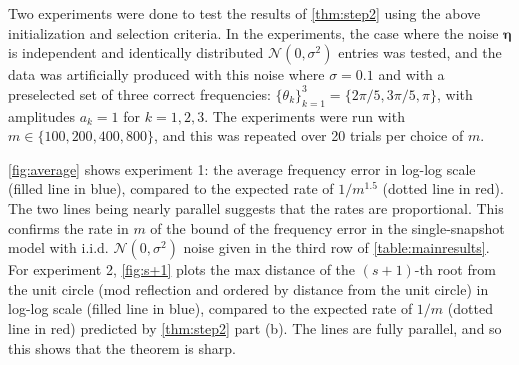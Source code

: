 \documentclass[11pt]{article}
\theoremstyle{definition}
\numberwithin{theorem}{section}
\numberwithin{equation}{section}
\renewcommand{\epsilon}{\varepsilon}
\newcommand{\bfeta}{{\boldsymbol \eta}}
\newcommand{\calN}{\mathcal{N}}
\numberwithin{equation}{section}
\begin{document}
Two experiments were done to test the results of \cref{thm:step2} using the above initialization and selection criteria. In the experiments, the case where the noise $\bfeta$ is independent and identically distributed $\calN(0,\sigma^2)$ entries was tested, and the data was artificially produced with this noise where $\sigma=0.1$ and with a preselected set of three correct frequencies: $\{\theta_k\}_{k=1}^3 = \{2\pi/5, 3\pi/5, \pi\}$, with amplitudes $a_k = 1$ for $k=1,2,3$. The experiments were run with $m\in\{100,200,400,800\}$, and this was repeated over 20 trials per choice of $m$. 


\cref{fig:average} shows experiment 1: the average frequency error in log-log scale (filled line in blue), compared to the expected rate of $1/m^{1.5}$ (dotted line in red). The two lines being nearly parallel suggests that the rates are proportional. This confirms the rate in $m$ of the bound of the frequency error in the single-snapshot model with i.i.d. $\calN(0,\sigma^2)$ noise given in the third row of \cref{table:mainresults}. For experiment 2, \cref{fig:s+1} plots the max distance of the $(s+1)$-th root from the unit circle (mod reflection and ordered by distance from the unit circle) in log-log scale (filled line in blue), compared to the expected rate of $1/m$ (dotted line in red) predicted by \cref{thm:step2} part (b). The lines are fully parallel, and so this shows that the theorem is sharp.


\end{document}
